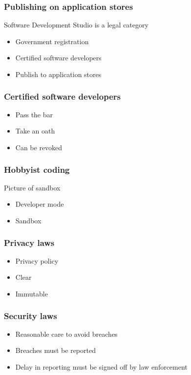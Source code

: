 \begin{frame}[fragile]
\frametitle{Publishing on application stores}

Software Development Studio is a legal category

\end{frame}

\begin{itemize}
\item Government registration
\item Certified software developers
\item Publish to application stores
\end{itemize}

\begin{frame}[fragile]
\frametitle{Certified software developers}


\end{frame}

\begin{itemize}
\item Pass the bar
\item Take an oath
\item Can be revoked
\end{itemize}

\begin{frame}[fragile]
\frametitle{Hobbyist coding}
Picture of sandbox
\end{frame}

\begin{itemize}
\item Developer mode
\item Sandbox
\end{itemize}



\begin{frame}[fragile]
\frametitle{Privacy laws}

\end{frame}

\begin{itemize}
\item Privacy policy
\item Clear
\item Immutable
\end{itemize}


\begin{frame}[fragile]
\frametitle{Security laws}


\end{frame}

\begin{itemize}
\item Reasonable care to avoid breaches
\item Breaches must be reported
\item Delay in reporting must be signed off by law enforcement
\end{itemize}

